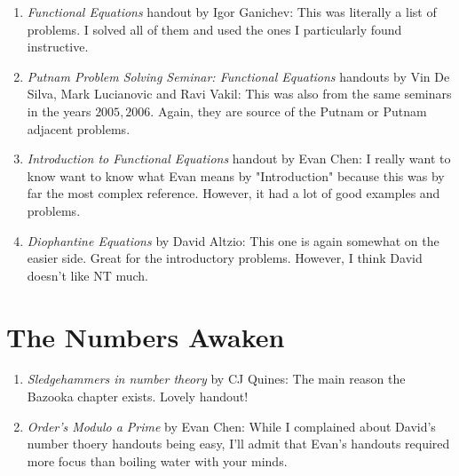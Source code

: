 \begin{enumerate}
    \item \emph{Functional Equations} handout by Igor Ganichev: This was literally a list of problems. I solved all of them and used the ones I particularly found instructive.
    \item \emph{Putnam Problem Solving Seminar: Functional Equations} handouts by Vin De Silva, Mark Lucianovic and Ravi Vakil: This was also from the same seminars in the years $2005, 2006$. Again, they are source of the Putnam or Putnam adjacent problems.
    \item \emph{Introduction to Functional Equations} handout by Evan Chen: I really want to know want to know what Evan means by "Introduction" because this was by far the most complex reference. However, it had a lot of good examples and problems.
    \item \emph{Diophantine Equations} by David Altzio: This one is again somewhat on the easier side. Great for the introductory problems. However, I think David doesn't like NT much.
\end{enumerate}
\section{The Numbers Awaken}
\begin{enumerate}
\item \emph{Sledgehammers in number theory} by CJ Quines: The main reason the Bazooka chapter exists. Lovely handout!
\item \emph{Order's Modulo a Prime} by Evan Chen: While I complained about David's number thoery handouts being easy, I'll admit that Evan's handouts required more focus than boiling water with your minds.\\
\end{enumerate}
